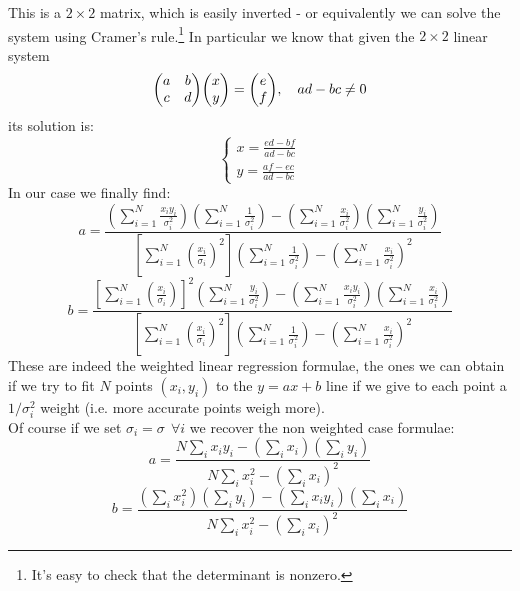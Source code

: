 \documentclass[a4paper]{article}
\newcommand{\tonde}[1]{\left( {#1} \right)}
\newcommand{\quadre}[1]{\left[ {#1} \right]}
\begin{document}
This is a $2\times 2$ matrix, which is easily inverted - or equivalently we can solve the system using Cramer's rule.\footnote{It's easy to check that the determinant is nonzero.} In particular we know that given the $2\times 2$ linear system
\begin{equation*}
    \mqty(a & b \\ c & d)\mqty(x \\ y) = \mqty(e \\f), \quad ad-bc \neq 0
\end{equation*}
its solution is:
\begin{equation*}
    \begin{cases}
        x = \frac{ed-bf}{ad-bc} \\
        y = \frac{af-ec}{ad-bc}
    \end{cases}
\end{equation*}
In our case we finally find:
\begin{equation*}
    a = \frac{\tonde{\sum_{i=1}^N \frac{x_i y_i}{\sigma_i^2}} \tonde{\sum_{i=1}^N \frac{1}{\sigma_i^2}} - \tonde{\sum_{i=1}^N \frac{x_i}{\sigma_i^2}}\tonde{\sum_{i=1}^N \frac{y_i}{\sigma_i^2}}}{\quadre{\sum_{i=1}^N \tonde{\frac{x_i}{\sigma_i}}^2}\tonde{\sum_{i=1}^N \frac{1}{\sigma_i^2}} - \tonde{\sum_{i=1}^N \frac{x_i}{\sigma_i^2}}^2}
\end{equation*}
\begin{equation*}
    b = \frac{\quadre{\sum_{i=1}^N \tonde{\frac{x_i}{\sigma_i}}}^2 \tonde{\sum_{i=1}^N \frac{y_i}{\sigma_i^2}} - \tonde{\sum_{i=1}^N \frac{x_i y_i}{\sigma_i^2}}\tonde{\sum_{i=1}^N \frac{x_i}{\sigma_i^2}}}{\quadre{\sum_{i=1}^N \tonde{\frac{x_i}{\sigma_i}}^2}\tonde{\sum_{i=1}^N \frac{1}{\sigma_i^2}} - \tonde{\sum_{i=1}^N \frac{x_i}{\sigma_i^2}}^2}
\end{equation*}
These are indeed the weighted linear regression formulae, the ones we can obtain if we try to fit $N$ points $(x_i, y_i)$ to the $y = ax + b$ line if we give to each point a $1/\sigma_i^2$ weight (i.e. more accurate points weigh more).\\ 
Of course if we set $\sigma_i = \sigma \ \ \forall i$ we recover the non weighted case formulae:
\begin{equation}
\label{eq:a_non_pesato}
    a = \frac{N \sum_i x_i y_i - \tonde{\sum_i x_i}\tonde{\sum_i y_i}}{N\sum_i x_i^2 - \tonde{\sum_i x_i}^2}
\end{equation}
\begin{equation}
\label{eq:b_non_pesato}
    b = \frac{\tonde{\sum_i x_i^2}\tonde{\sum_i y_i} - \tonde{\sum_i x_i y_i}\tonde{\sum_i x_i}}{N\sum_i x_i^2 - \tonde{\sum_i x_i}^2}
\end{equation}
\end{document}
